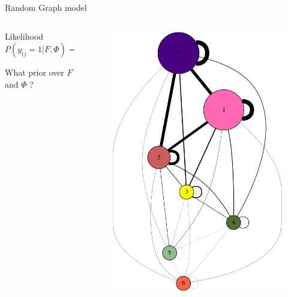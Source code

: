 \begin{frame}[t]{Random Graph model}
\begin{columns}
\begin{column}{0.6\textwidth}
    \begin{block}{Likelihood}
    \[ P(y_{ij}=1 | F, \Phi) = h(f_i \Phi f_j^T) \]
    \end{block}
    What prior over $F$ and $\Phi$ ?
        \end{column}
        \begin{column}{0.4\textwidth}
        \begin{figure}[h]
        \includegraphics[scale=0.15]{img/gdot.png}
        \end{figure}
        \end{column}
    \end{columns}


\end{frame}

\newcommand\setrow{}

